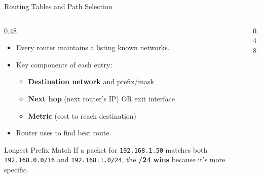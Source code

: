 \documentclass[aspectratio=169]{beamer}  %
\begin{document}
\begin{frame}{Routing Tables and Path Selection}
    \begin{columns}[T]
        \begin{column}{0.48\textwidth}
            \begin{itemize}
                \item Every router maintains a  listing known networks.
                \item Key components of each entry:
                    \begin{itemize}
                        \item \textbf{Destination network} and prefix/mask
                        \item \textbf{Next hop} (next router's IP) OR exit interface
                        \item \textbf{Metric} (cost to reach destination)
                    \end{itemize}
                \item Router uses  to find best route.
            \end{itemize}
            
            \vspace{0.3em}
            \begin{exampleblock}{Longest Prefix Match}
                If a packet for \texttt{192.168.1.50} matches both \texttt{192.168.0.0/16} and \texttt{192.168.1.0/24}, the \textbf{/24 wins} because it's more specific.
            \end{exampleblock}
        \end{column}
        \begin{column}{0.48\textwidth}
            \begin{center}
\end{center}
\end{column}
\end{columns}
\end{frame}
\end{document}
